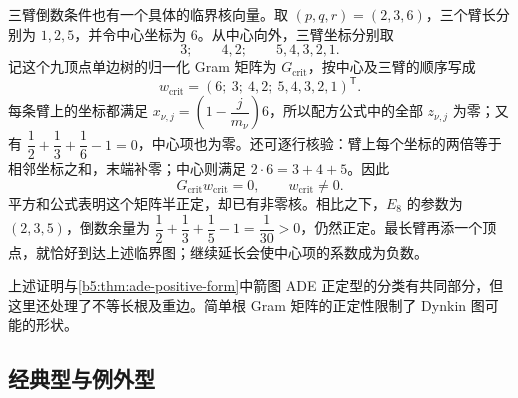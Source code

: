 三臂倒数条件也有一个具体的临界核向量。取 \((p,q,r)=(2,3,6)\)，三个臂长分别为 \(1,2,5\)，并令中心坐标为 \(6\)。从中心向外，三臂坐标分别取
\[
	3;\qquad 4,2;\qquad 5,4,3,2,1.
\]
记这个九顶点单边树的归一化 Gram 矩阵为 \(G_{\mathrm{crit}}\)，按中心及三臂的顺序写成
\[
	w_{\mathrm{crit}}=(6;\ 3;\ 4,2;\ 5,4,3,2,1)^{\mathsf T}.
\]
每条臂上的坐标都满足 \(x_{\nu,j}=(1-\dfrac{j}{m_\nu})6\)，所以配方公式中的全部 \(z_{\nu,j}\) 为零；又有 \(\dfrac12+\dfrac13+\dfrac16-1=0\)，中心项也为零。还可逐行核验：臂上每个坐标的两倍等于相邻坐标之和，末端补零；中心则满足 \(2\cdot6=3+4+5\)。因此
\[
	G_{\mathrm{crit}}w_{\mathrm{crit}}=0, \qquad w_{\mathrm{crit}}\ne0.
\]
平方和公式表明这个矩阵半正定，却已有非零核。相比之下，\(E_8\) 的参数为 \((2,3,5)\)，倒数余量为 \(\dfrac12+\dfrac13+\dfrac15-1=\dfrac1{30}>0\)，仍然正定。最长臂再添一个顶点，就恰好到达上述临界图；继续延长会使中心项的系数成为负数。

\ProseParagraphBreak

上述证明与\cref{b5:thm:ade-positive-form}中箭图 ADE 正定型的分类有共同部分，但这里还处理了不等长根及重边。简单根 Gram 矩阵的正定性限制了 Dynkin 图可能的形状。

\subsection{经典型与例外型}
\label{b5:subsec:1703:02}

